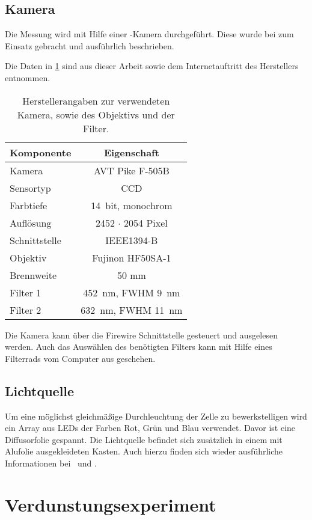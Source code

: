 \subsection{Kamera}
\label{sec:cam}
Die Messung wird mit Hilfe einer -Kamera durchgeführt. Diese wurde  bei \cite{heberle} zum Einsatz gebracht und ausführlich beschrieben. 

Die Daten in \ref{tab:cam} sind aus dieser Arbeit sowie dem Internetauftritt des Herstellers \citep{pike_sheet} entnommen. 
\begin{table}[h]
 \begin{tabularx}{\linewidth}{X|c}
  Komponente	& Eigenschaft \\
  \hline\hline
  Kamera	& AVT Pike F-505B \\
  Sensortyp	& CCD \\
  Farbtiefe	& \SI{14}{bit}, monochrom \\
  Auflösung	& 2452 $\cdot$ 2054 Pixel \\
  Schnittstelle	& IEEE1394-B \\
  \hline
  Objektiv	& Fujinon HF50SA-1 \\
  Brennweite	& 50 mm \\
  \hline
  Filter 1	& \SI{452}{\nano\meter}, FWHM \SI{9}{\nano\meter} \\
  Filter 2	& \SI{632}{\nano\meter}, FWHM \SI{11}{\nano\meter} 
 \end{tabularx}
 \caption{Herstellerangaben zur verwendeten Kamera, sowie des Objektivs und der Filter.}
 \label{tab:cam}
\end{table}
Die Kamera kann über die Firewire Schnittstelle gesteuert und ausgelesen werden. Auch das Auswählen des benötigten Filters kann mit Hilfe eines Filterrads vom Computer aus geschehen.

\subsection{Lichtquelle}
\label{sec:light}
Um eine möglichst gleichmäßige Durchleuchtung der Zelle zu bewerkstelligen wird ein Array aus LEDs der Farben Rot, Grün und Blau verwendet. Davor ist eine Diffusorfolie gespannt. Die Lichtquelle befindet sich zusätzlich in einem mit Alufolie ausgekleideten Kasten. Auch hierzu finden sich wieder ausführliche Informationen bei \cite{buchner}\ und \cite{heberle}.


\section{Verdunstungsexperiment}
\label{set:eva}

